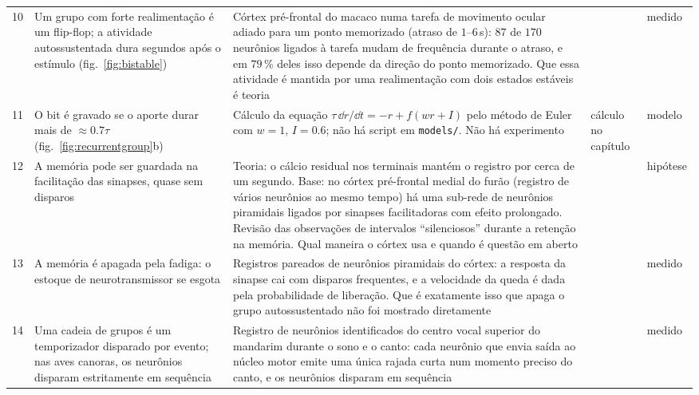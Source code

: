 {\begin{longtable}{>{\raggedright}p{0.5cm}>{\raggedright}p{4.0cm}>{\raggedright}p{5.6cm}>{\raggedright}p{2.3cm}>{\raggedright\arraybackslash}p{1.7cm}}
10 & Um grupo com forte realimentação é um flip-flop; a atividade autossustentada dura segundos após o estímulo (fig.~\ref{fig:bistable}) & Córtex pré-frontal do macaco numa tarefa de movimento ocular adiado para um ponto memorizado (atraso de $1$--$6$\,s): $87$ de $170$ neurônios ligados à tarefa mudam de frequência durante o atraso, e em $79\,\%$ deles isso depende da direção do ponto memorizado. Que essa atividade é mantida por uma realimentação com dois estados estáveis é teoria & \cite{Funahashi1989,Wang2001} & medido \\
11 & O bit é gravado se o aporte durar mais de $\approx0.7\tau$ (fig.~\ref{fig:recurrentgroup}b) & Cálculo da equação $\tau\,\dd r/\dd t=-r+f(wr+I)$ pelo método de Euler com $w=1$, $I=0.6$; não há script em \texttt{models/}. Não há experimento & cálculo no capítulo & modelo \\
12 & A memória pode ser guardada na facilitação das sinapses, quase sem disparos & Teoria: o cálcio residual nos terminais mantém o registro por cerca de um segundo. Base: no córtex pré-frontal medial do furão (registro de vários neurônios ao mesmo tempo) há uma sub-rede de neurônios piramidais ligados por sinapses facilitadoras com efeito prolongado. Revisão das observações de intervalos ``silenciosos'' durante a retenção na memória. Qual maneira o córtex usa e quando é questão em aberto & \cite{Mongillo2008,WangMarkram2006,Stokes2015} & hipótese \\
13 & A memória é apagada pela fadiga: o estoque de neurotransmissor se esgota & Registros pareados de neurônios piramidais do córtex: a resposta da sinapse cai com disparos frequentes, e a velocidade da queda é dada pela probabilidade de liberação. Que é exatamente isso que apaga o grupo autossustentado não foi mostrado diretamente & \cite{Tsodyks1997} & medido \\
14 & Uma cadeia de grupos é um temporizador disparado por evento; nas aves canoras, os neurônios disparam estritamente em sequência & Registro de neurônios identificados do centro vocal superior do mandarim durante o sono e o canto: cada neurônio que envia saída ao núcleo motor emite uma única rajada curta num momento preciso do canto, e os neurônios disparam em sequência & \cite{Hahnloser2002} & medido \\
\bottomrule
\end{longtable}}
